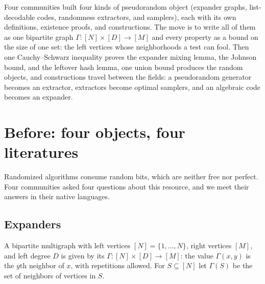 \newcommand{\pseudorandomList}{\mathrm{LIST}}
\newcommand{\pseudorandomAgr}{\operatorname{agr}}
\newcommand{\pseudorandomCP}{\operatorname{CP}}
\newcommand{\pseudorandomKL}{\operatorname{KL}}
\newcommand{\pseudorandomExt}{\operatorname{Ext}}
\newcommand{\pseudorandomEnc}{\operatorname{Enc}}
\newcommand{\pseudorandomSamp}{\operatorname{Samp}}
\newcommand{\pseudorandomHmin}{H_{\infty}}
\newcommand{\pseudorandomZigzag}{\mathbin{\text{\textcircled{\scriptsize z}}}}

\begin{refsection}

\begin{chaptersummary}
Four communities built four kinds of pseudorandom object (expander graphs, list-decodable codes, randomness extractors, and samplers), each with its own definitions, existence proofs, and constructions. The move is to write all of them as one bipartite graph $\Gamma\colon[N]\times[D]\to[M]$ and every property as a bound on the size of one set: the left vertices whose neighborhoods a test can fool. Then one Cauchy--Schwarz inequality proves the expander mixing lemma, the Johnson bound, and the leftover hash lemma, one union bound produces the random objects, and constructions travel between the fields: a pseudorandom generator becomes an extractor, extractors become optimal samplers, and an algebraic code becomes an expander.
\end{chaptersummary}

\section{Before: four objects, four literatures}\label{sec:pseudorandom:before}

Randomized algorithms consume random bits, which are neither free nor perfect. Four communities asked four questions about this resource, and we meet their answers in their native languages.

\subsection{Expanders}\label{sec:pseudorandom:expanders}

A bipartite multigraph with left vertices $[N]=\{1,\dots,N\}$, right vertices $[M]$, and left degree $D$ is given by its  $\Gamma\colon[N]\times[D]\to[M]$: the value $\Gamma(x,y)$ is the $y$th neighbor of $x$, with repetitions allowed. For $S\subseteq[N]$ let $\Gamma(S)$ be the set of neighbors of vertices in $S$.


\end{refsection}
